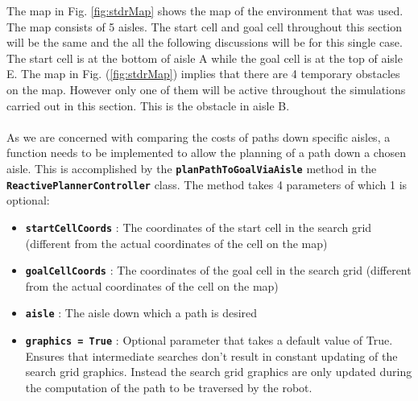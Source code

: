 \documentclass[a4paper,12pt]{article}
\begin{document}
	The map in Fig. \ref{fig:stdrMap} shows the map of the environment that was used. The map consists of 5 aisles. The start cell and goal cell throughout this section will be the same and the all the following discussions will be for this single case. The start cell is at the bottom of aisle A while the goal cell is at the top of aisle E. The map in Fig. (\ref{fig:stdrMap}) implies that there are 4 temporary obstacles on the map. However only one of them will be active throughout the simulations carried out in this section. This is the obstacle in aisle B.
		\\
		\\
		As we are concerned with comparing the costs of paths down specific aisles, a function needs to be implemented to allow the planning of a path down a chosen aisle. This is accomplished by the \texttt{\textbf{planPathToGoalViaAisle}} method in the \texttt{\textbf{ReactivePlannerController}} class. The method takes 4 parameters of which 1 is optional:
		\begin{itemize}
			\item \textbf{\texttt{startCellCoords}} : The coordinates of the start cell in the search grid (different from the actual coordinates of the cell on the map)
			\item \textbf{\texttt{goalCellCoords}} : The coordinates of the goal cell in the search grid (different from the actual coordinates of the cell on the map)
			\item \textbf{\texttt{aisle}} : The aisle down which a path is desired
			\item \textbf{\texttt{graphics = True}} : Optional parameter that takes a default value of True. Ensures that intermediate searches don't result in constant updating of the search grid graphics. Instead the search grid graphics are only updated during the computation of the path to be traversed by the robot. 
		\end{itemize} 
		
\end{document}

